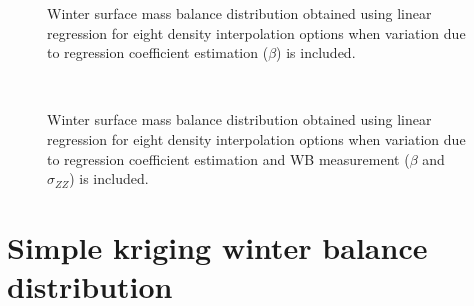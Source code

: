 \documentclass{sfuthesis}
\begin{document}
\begin{appendices}
\begin{figure}
	\caption[]{Winter surface mass balance distribution obtained using linear regression for eight density interpolation options when variation due to regression coefficient estimation ($\beta$) is included. }
	\label{fig:WSMB_LR_Distributionbeta}
\end{figure}
\begin{figure}
	\centering
	\\
	\caption[]{Winter surface mass balance distribution obtained using linear regression for eight density interpolation options when variation due to regression coefficient estimation and WB measurement ($\beta$ and $\sigma_{ZZ}$) is included. }
	\label{fig:WSMB_LR_DistributionbetaNzz}
\end{figure}

\pagebreak
\section{Simple kriging winter balance distribution}


\end{appendices}
\end{document}
